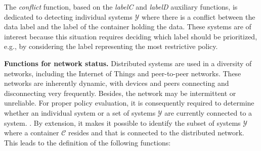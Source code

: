 The \emph{conflict} function, based on the \emph{labelC} and \emph{labelD} auxiliary functions, is dedicated to detecting individual systems $\mathcal{Y}$ where there is a conflict between the data label and the label of the container holding the data. These systems are of interest because this situation requires deciding which label should be prioritized, e.g., by considering the label representing the most restrictive policy.


\textbf{Functions for network status.} Distributed systems are used in a diversity of networks, including the Internet of Things and peer-to-peer networks. These networks are inherently dynamic, with devices and peers connecting and disconnecting very frequently. Besides, the network may be intermittent or unreliable. For proper policy evaluation, it is consequently required to determine whether an individual system or a set of systems $\mathcal{Y}$ are currently connected to a system. . By extension, it makes it possible to identify the subset of systems $\mathcal{Y}$ where a container $\mathcal{C}$ resides and that is connected to the distributed network. This leads to the definition of the following functions:

